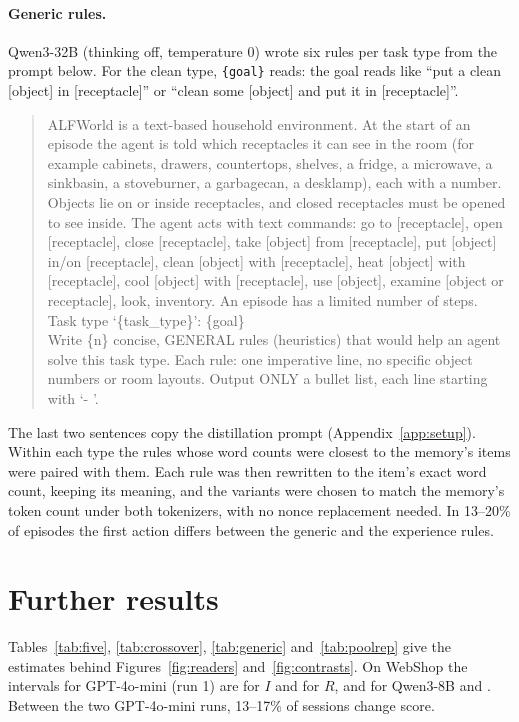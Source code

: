 \paragraph{Generic rules.} Qwen3-32B (thinking off, temperature 0) wrote six rules per task type from
the prompt below. For the clean type, \texttt{\{goal\}} reads: the goal reads like ``put a clean
[object] in [receptacle]'' or ``clean some [object] and put it in [receptacle]''.
\begin{quote}\small
ALFWorld is a text-based household environment. At the start of an episode the agent is told which
receptacles it can see in the room (for example cabinets, drawers, countertops, shelves, a fridge, a
microwave, a sinkbasin, a stoveburner, a garbagecan, a desklamp), each with a number. Objects lie on or
inside receptacles, and closed receptacles must be opened to see inside. The agent acts with text
commands: go to [receptacle], open [receptacle], close [receptacle], take [object] from [receptacle],
put [object] in/on [receptacle], clean [object] with [receptacle], heat [object] with [receptacle], cool
[object] with [receptacle], use [object], examine [object or receptacle], look, inventory. An episode
has a limited number of steps.\\[3pt]
Task type `\{task\_type\}': \{goal\}\\[3pt]
Write \{n\} concise, GENERAL rules (heuristics) that would help an agent solve this task type. Each
rule: one imperative line, no specific object numbers or room layouts. Output ONLY a bullet list, each
line starting with `- '.
\end{quote}
The last two sentences copy the distillation prompt (Appendix~\ref{app:setup}). Within each type the
rules whose word counts were closest to the memory's items were paired with them. Each rule was then
rewritten to the item's exact word count, keeping its meaning, and the variants were chosen to match the
memory's token count under both tokenizers, with no nonce replacement needed. In 13--20\% of episodes
the first action differs between the generic and the experience rules.

\section{Further results}
\label{app:results}

Tables~\ref{tab:five}, \ref{tab:crossover}, \ref{tab:generic} and~\ref{tab:poolrep} give the estimates
behind Figures~\ref{fig:readers} and~\ref{fig:contrasts}. On WebShop the intervals for GPT-4o-mini
(run 1) are  for $I$ and  for $R$, and for Qwen3-8B
 and . Between the two GPT-4o-mini runs, 13--17\% of sessions change
score.

